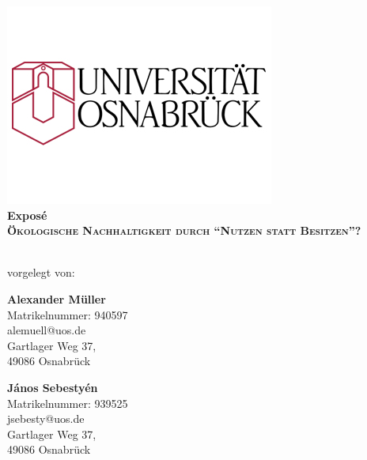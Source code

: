 \documentclass[11pt, titlepage=true]{scrartcl} %
\makeatletter
\newcommand{\autorOne}{Alexander Müller}
\newcommand{\matrikelnrOne}{940597}
\newcommand{\adresseOne}{Gartlager Weg 37, \\49086 Osnabrück}
\newcommand{\emailOne}{alemuell@uos.de}
\newcommand{\autorTwo}{János Sebestyén}
\newcommand{\matrikelnrTwo}{939525}
\newcommand{\adresseTwo}{Gartlager Weg 37, \\49086 Osnabrück}
\newcommand{\emailTwo}{jsebesty@uos.de}
\newcommand{\titel}{Ökologische Nachhaltigkeit durch \enquote{Nutzen statt Besitzen}?}
\newcommand{\stitle}{}
\newcommand{\art}{Exposé}
\makeatother
\begin{document}
\begin{titlepage}
  \begin{center}
    \includegraphics[scale=0.5]{Logo-Uni-Osnabrueck.jpg}\\[2ex]

    \vfill
    \LARGE{\textbf{\art}}\\[1.5ex]
    \huge{\textbf{\textsc{\titel}}}\\[1.0ex]
    \LARGE{\textbf{\stitle}}\\[2ex]
    \vspace{1cm}

    \normalsize
    vorgelegt von:\\[12pt]

      \begin{minipage}[]{0.30\textwidth}
        \textbf{\autorOne}\\
        Matrikelnummer: \matrikelnrOne\\
        \emailOne\\
        \adresseOne\\
      \end{minipage}
      \hspace{0.15\textwidth}
      \begin{minipage}[]{0.3\textwidth}
        \textbf{\autorTwo}\\
        Matrikelnummer: \matrikelnrTwo\\
        \emailTwo\\
        \adresseTwo\\
      \end{minipage}


\end{center}
\end{titlepage}
\end{document}
